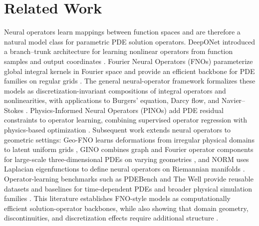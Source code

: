 \section{Related Work}

Neural operators learn mappings between function spaces and are therefore a natural model class for parametric PDE solution operators. DeepONet introduced a branch--trunk architecture for learning nonlinear operators from function samples and output coordinates \citep{lu2021deeponet}. Fourier Neural Operators (FNOs) parameterize global integral kernels in Fourier space and provide an efficient backbone for PDE families on regular grids \citep{li2021fno}. The general neural-operator framework formalizes these models as discretization-invariant compositions of integral operators and nonlinearities, with applications to Burgers' equation, Darcy flow, and Navier--Stokes \citep{kovachki2023neuraloperator}. Physics-Informed Neural Operators (PINOs) add PDE residual constraints to operator learning, combining supervised operator regression with physics-based optimization \citep{li2024pino}. Subsequent work extends neural operators to geometric settings: Geo-FNO learns deformations from irregular physical domains to latent uniform grids \citep{li2023geofno}, GINO combines graph and Fourier operator components for large-scale three-dimensional PDEs on varying geometries \citep{li2023gino}, and NORM uses Laplacian eigenfunctions to define neural operators on Riemannian manifolds \citep{chen2024norm}. Operator-learning benchmarks such as PDEBench and The Well provide reusable datasets and baselines for time-dependent PDEs and broader physical simulation families \citep{takamoto2022pdebench,ohana2024well}. This literature establishes FNO-style models as computationally efficient solution-operator backbones, while also showing that domain geometry, discontinuities, and discretization effects require additional structure \citep{lanthaler2023discontinuous}.

